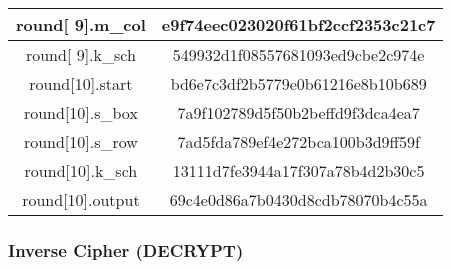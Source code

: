\begin{center}
\begin{longtable}{ |c|c| }
\hline
round[ 9].m\_col  & e9f74eec023020f61bf2ccf2353c21c7\\
\hline
round[ 9].k\_sch  & 549932d1f08557681093ed9cbe2c974e\\
\hline
round[10].start   & bd6e7c3df2b5779e0b61216e8b10b689\\
\hline
round[10].s\_box  & 7a9f102789d5f50b2beffd9f3dca4ea7\\
\hline
round[10].s\_row  & 7ad5fda789ef4e272bca100b3d9ff59f\\
\hline
round[10].k\_sch  & 13111d7fe3944a17f307a78b4d2b30c5\\
\hline
round[10].output & 69c4e0d86a7b0430d8cdb78070b4c55a\\
\hline

\end{longtable}
\end{center}

\subsubsection{Inverse Cipher (DECRYPT)}

